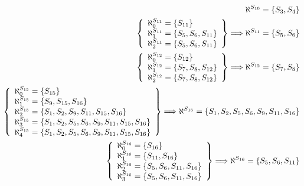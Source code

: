 \begin{itemize}
\begin{align*}
{		      }{\aleph^{S_{10}}    = \cbr{S_3, S_4}}                                       \\
		      \setconc{
		      \aleph^{S_{11}}_{0}  = \cbr{S_{11}}                                          \\
		      \aleph^{S_{11}}_{1}  = \cbr{S_5, S_6, S_{11}}                                \\
		      \aleph^{S_{11}}_{2}  = \cbr{S_5, S_6, S_{11}}                                \\
		      }{\aleph^{S_{11}}    = \cbr{S_5, S_6}}                                       \\
		      \setconc{
		      \aleph^{S_{12}}_{0}  = \cbr{S_{12}}                                          \\
		      \aleph^{S_{12}}_{1}  = \cbr{S_7, S_8, S_{12}}                                \\
		      \aleph^{S_{12}}_{2}  = \cbr{S_7, S_8, S_{12}}                                \\
		      }{\aleph^{S_{12}}    = \cbr{S_7, S_8}}                                       \\
		      \setconc{
		      \aleph^{S_{15}}_{0}  = \cbr{S_{15}}                                          \\
		      \aleph^{S_{15}}_{1}  = \cbr{S_9, S_{15}, S_{16}}                             \\
		      \aleph^{S_{15}}_{2}  = \cbr{S_1, S_2, S_9, S_{11}, S_{15}, S_{16}}           \\
		      \aleph^{S_{15}}_{3}  = \cbr{S_1, S_2, S_5, S_6, S_9, S_{11}, S_{15}, S_{16}} \\
		      \aleph^{S_{15}}_{4}  = \cbr{S_1, S_2, S_5, S_6, S_9, S_{11}, S_{15}, S_{16}} \\
		      }{\aleph^{S_{15}}    = \cbr{S_1, S_2, S_5, S_6, S_9, S_{11}, S_{16}}}        \\
		      \setconc{
		      \aleph^{S_{16}}_{0}  = \cbr{S_{16}}                                          \\
		      \aleph^{S_{16}}_{1}  = \cbr{S_{11}, S_{16}}                                  \\
		      \aleph^{S_{16}}_{2}  = \cbr{S_5, S_6, S_{11}, S_{16}}                        \\
		      \aleph^{S_{16}}_{3}  = \cbr{S_5, S_6, S_{11}, S_{16}}                        \\
		      }{\aleph^{S_{16}}    = \cbr{S_5, S_6, S_{11}}}                               \\

\end{align*}
\end{itemize}
